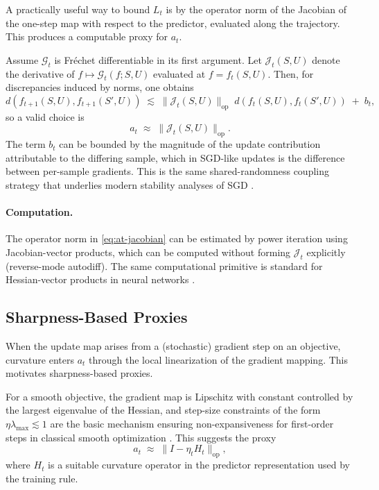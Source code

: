 \documentclass{article}
\numberwithin{equation}{section}
\begin{document}
A practically useful way to bound $L_t$ is by the operator norm of the Jacobian of the one-step map with respect to the predictor, evaluated along the trajectory.
This produces a computable proxy for $a_t$.

Assume $\mathcal{G}_t$ is Fr{\'e}chet differentiable in its first argument.
Let $\mathcal{J}_t(S,U)$ denote the derivative of $f\mapsto \mathcal{G}_t(f;S,U)$ evaluated at $f=f_t(S,U)$.
Then, for discrepancies induced by norms, one obtains
\[
d(f_{t+1}(S,U),f_{t+1}(S',U))
\;\lesssim\;
\|\mathcal{J}_t(S,U)\|_{\mathrm{op}}\; d(f_t(S,U),f_t(S',U)) \;+\; b_t,
\]
so a valid choice is
\begin{equation}
	\label{eq:at-jacobian}
	a_t \;\approx\; \|\mathcal{J}_t(S,U)\|_{\mathrm{op}}.
\end{equation}
The term $b_t$ can be bounded by the magnitude of the update contribution attributable to the differing sample, which in SGD-like updates is the difference between per-sample gradients.
This is the same shared-randomness coupling strategy that underlies modern stability analyses of SGD \cite{pmlr-v48-hardt16}.

\paragraph{Computation.}
The operator norm in \eqref{eq:at-jacobian} can be estimated by power iteration using Jacobian-vector products, which can be computed without forming $\mathcal{J}_t$ explicitly (reverse-mode autodiff).
The same computational primitive is standard for Hessian-vector products in neural networks \cite{pearlmutter1994fast}.

\subsection{Sharpness-Based Proxies}
\label{subsec:sharpness}

When the update map arises from a (stochastic) gradient step on an objective, curvature enters $a_t$ through the local linearization of the gradient mapping.
This motivates sharpness-based proxies.

For a smooth objective, the gradient map is Lipschitz with constant controlled by the largest eigenvalue of the Hessian, and step-size constraints of the form $\eta\lambda_{\max}\lesssim 1$ are the basic mechanism ensuring non-expansiveness for first-order steps in classical smooth optimization \cite{nesterov2004introductory}.
This suggests the proxy
\[
a_t \;\approx\; \big\|I-\eta_t H_t\big\|_{\mathrm{op}},
\]
where $H_t$ is a suitable curvature operator in the predictor representation used by the training rule.
\end{document}
